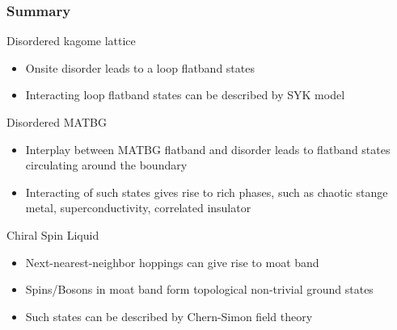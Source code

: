 \begin{frame}[allowframebreaks]
\frametitle{Summary}
    \begin{center}
        \begin{minipage}{0.8\textwidth}
        \begin{block}{Disordered kagome lattice}
            \begin{itemize}
                \item Onsite disorder leads to a loop flatband states
                \item Interacting loop flatband states can be described by SYK model
            \end{itemize}
        \end{block}
        \end{minipage}
    
        \vspace{0.5cm}
    
        \begin{minipage}{0.8\textwidth}
        \begin{block}{Disordered MATBG}
            \begin{itemize}
                \item Interplay between MATBG flatband and disorder leads to flatband states circulating around the boundary
                \item Interacting of such states gives rise to rich phases, such as chaotic stange metal, superconductivity, correlated insulator
            \end{itemize}
        \end{block}
        \end{minipage}
    
        \vspace{1cm}
    
        \begin{minipage}{0.8\textwidth}
        \begin{block}{Chiral Spin Liquid}
            \begin{itemize}
                \item Next-nearest-neighbor hoppings can give rise to moat band
                \item Spins/Bosons in moat band form topological non-trivial ground states
                \item Such states can be described by Chern-Simon field theory
            \end{itemize}
        \end{block}
        \end{minipage}
    

\end{center}
\end{frame}
